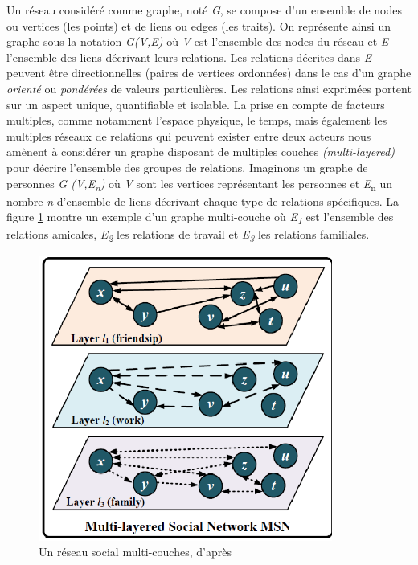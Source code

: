 Un réseau considéré comme graphe, noté \textit{G}, se compose d{\textquoteright}un ensemble de nodes ou vertices (les points) et de liens ou edges (les traits). On représente ainsi un graphe sous la notation \textit{G(V,E)} o\`u \textit{V }est l{\textquoteright}ensemble des nodes du réseau et \textit{E} l{\textquoteright}ensemble des liens\textit{ }décrivant leurs relations. Les relations décrites dans \textit{E} peuvent \^etre directionnelles (paires de vertices ordonnées) dans le cas d{\textquoteright}un graphe \textit{orienté }ou \textit{pondérées} de valeurs particulières. Les relations ainsi exprimées portent sur un aspect unique, quantifiable et isolable. La prise en compte de facteurs multiples, comme notamment l{\textquoteright}espace physique, le temps, mais également les multiples réseaux de relations qui peuvent exister entre deux acteurs nous amènent à considérer un graphe disposant de multiples couches \textit{(}\textit{multi-layered)} pour décrire l{\textquoteright}ensemble des groupes de relations. Imaginons un graphe de personnes \textit{G (V,E}\textit{\textsubscript{n}}\textit{)} o\`u \textit{V }sont les vertices représentant les personnes et \textit{E}\textsubscript{n} un nombre \textit{n }d{\textquoteright}ensemble de liens\textit{ }décrivant chaque type de relations spécifiques. La figure \ref{fig:multi-layer} montre un exemple d{\textquoteright}un graphe multi-couche o\`u \textit{E}\textit{\textsubscript{1}} est l{\textquoteright}ensemble des relations amicales, \textit{E}\textit{\textsubscript{2}}\textsubscript{ }les relations de travail et \textit{E}\textit{\textsubscript{3}}\textsubscript{ }les relations familiales.

\begin{figure}
    \centering
    \includegraphics[width=3.8004in,height=3.6894in]{figures/chap3/chapitre3-img3.png}
    \caption [réseau social multi-couches] {Un réseau social multi-couches, d{\textquoteright}après \cite{Brodka2013}}
    \label{fig:multi-layer}
\end{figure}

